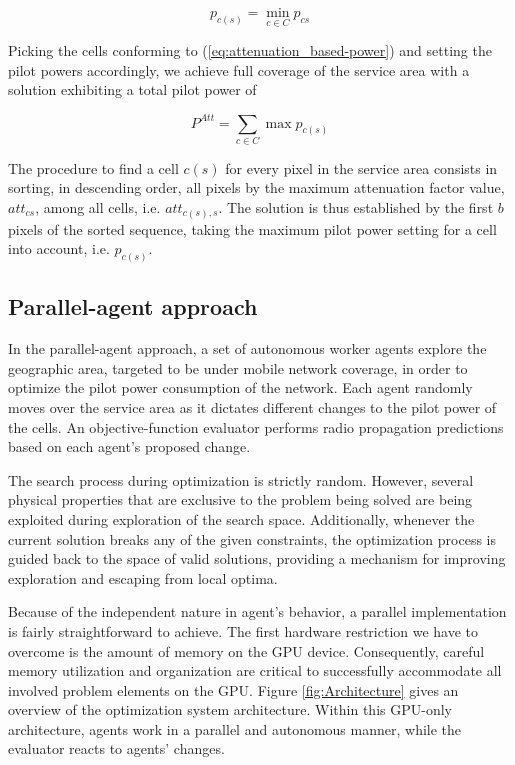 \begin{equation}
p_{c(s)}=\min_{c\in C}p_{cs}\label{eq:attenuation_based-power}
\end{equation}


Picking the cells conforming to (\ref{eq:attenuation_based-power})
and setting the pilot powers accordingly, we achieve full coverage
of the service area with a solution exhibiting a total pilot power
of

\begin{equation}
P^{Att}=\sum_{c\in C}\max p_{c(s)}
\end{equation}


The procedure to find a cell $c(s)$ for every pixel in the service
area consists in sorting, in descending order, all pixels by the maximum
attenuation factor value, $att_{cs}$, among all cells, i.e. $att_{c(s),s}$.
The solution is thus established by the first $b$ pixels of the sorted
sequence, taking the maximum pilot power setting for a cell into account,
i.e. $p_{c(s)}$.


\subsection{Parallel-agent approach \label{sub:Parallel-multi-agent-approach}}

In the parallel-agent approach, a set of autonomous worker agents
explore the geographic area, targeted to be under mobile network coverage,
in order to optimize the pilot power consumption of the network. Each
agent randomly moves over the service area as it dictates different
changes to the pilot power of the cells. An objective-function evaluator
performs radio propagation predictions based on each agent's proposed
change.

The search process during optimization is strictly random. However,
several physical properties that are exclusive to the problem being
solved are being exploited during exploration of the search space.
Additionally, whenever the current solution breaks any of the given
constraints, the optimization process is guided back to the space
of valid solutions, providing a mechanism for improving exploration
and escaping from local optima.

Because of the independent nature in agent's behavior, a parallel
implementation is fairly straightforward to achieve. The first hardware
restriction we have to overcome is the amount of memory on the GPU
device. Consequently, careful memory utilization and organization
are critical to successfully accommodate all involved problem elements
on the GPU. Figure \ref{fig:Architecture} gives an overview of the
optimization system architecture. Within this GPU-only architecture,
agents work in a parallel and autonomous manner, while the evaluator
reacts to agents' changes.

